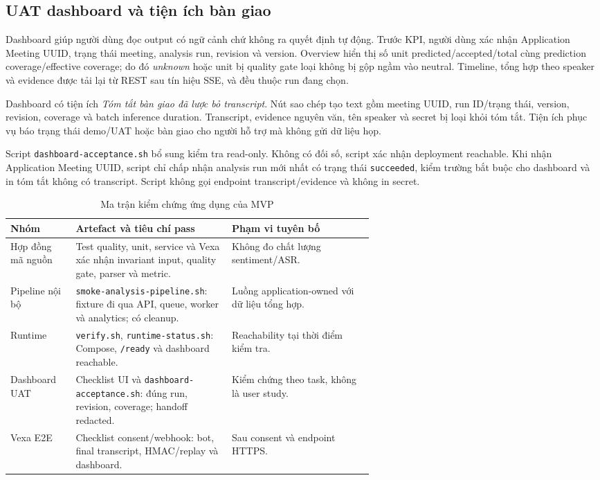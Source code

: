 \subsection{UAT dashboard và tiện ích bàn giao}

Dashboard giúp người dùng đọc output có ngữ cảnh chứ không ra quyết định tự động. Trước KPI, người dùng xác nhận Application Meeting UUID, trạng thái meeting, analysis run, revision và version. Overview hiển thị số unit predicted/accepted/total cùng prediction coverage/effective coverage; do đó \textit{unknown} hoặc unit bị quality gate loại không bị gộp ngầm vào neutral. Timeline, tổng hợp theo speaker và evidence được tải lại từ REST sau tín hiệu SSE, và đều thuộc run đang chọn.

Dashboard có tiện ích \emph{Tóm tắt bàn giao đã lược bỏ transcript}. Nút sao chép tạo text gồm meeting UUID, run ID/trạng thái, version, revision, coverage và batch inference duration. Transcript, evidence nguyên văn, tên speaker và secret bị loại khỏi tóm tắt. Tiện ích phục vụ báo trạng thái demo/UAT hoặc bàn giao cho người hỗ trợ mà không gửi dữ liệu họp.

Script \texttt{dashboard-acceptance.sh} bổ sung kiểm tra read-only. Không có đối số, script xác nhận deployment reachable. Khi nhận Application Meeting UUID, script chỉ chấp nhận analysis run mới nhất có trạng thái \texttt{succeeded}, kiểm trường bắt buộc cho dashboard và in tóm tắt không có transcript. Script không gọi endpoint transcript/evidence và không in secret.

\begin{table}[H]
\centering
\small
\renewcommand{\arraystretch}{1.16}
\caption{Ma trận kiểm chứng ứng dụng của MVP}
\label{tab:application-verification-matrix}
\begin{tabularx}{\linewidth}{>{\raggedright\arraybackslash}p{0.18\linewidth}>{\raggedright\arraybackslash}p{0.43\linewidth}>{\raggedright\arraybackslash}X}
\toprule
Nhóm & Artefact và tiêu chí pass & Phạm vi tuyên bố \\ \midrule
Hợp đồng mã nguồn & Test quality, unit, service và Vexa xác nhận invariant input, quality gate, parser và metric. & Không đo chất lượng sentiment/ASR. \\
Pipeline nội bộ & \texttt{smoke-analysis-pipeline.sh}: fixture đi qua API, queue, worker và analytics; có cleanup. & Luồng application-owned với dữ liệu tổng hợp. \\
Runtime & \texttt{verify.sh}, \texttt{runtime-status.sh}: Compose, \texttt{/ready} và dashboard reachable. & Reachability tại thời điểm kiểm tra. \\
Dashboard UAT & Checklist UI và \texttt{dashboard-acceptance.sh}: đúng run, revision, coverage; handoff redacted. & Kiểm chứng theo task, không là user study. \\
Vexa E2E & Checklist consent/webhook: bot, final transcript, HMAC/replay và dashboard. & Sau consent và endpoint HTTPS. \\
\bottomrule
\end{tabularx}
\end{table}

